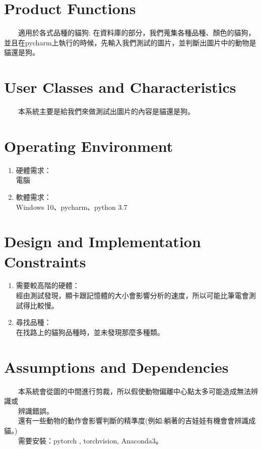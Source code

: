 \documentclass{scrreprt}
\begin{document}
\begin{CJK*}{UTF8}{bsmi}
\section{Product Functions}
　　適用於各式品種的貓狗: 在資料庫的部分，我們蒐集各種品種、顏色的貓狗，並且在pycharm上執行的時候，先輸入我們測試的圖片，並判斷出圖片中的動物是貓還是狗。

\section{User Classes and Characteristics}
　　本系統主要是給我們來做測試出圖片的內容是貓還是狗。

\section{Operating Environment}
\begin{enumerate}
	\item 硬體需求：\\電腦
	\item 軟體需求：\\Windows 10、pycharm、python 3.7
\end{enumerate}

\section{Design and Implementation Constraints}
\begin{enumerate}
	\item 需要較高階的硬體：\\經由測試發現，顯卡跟記憶體的大小會影響分析的速度，所以可能比筆電會測試得比較慢。
	\item 尋找品種：\\在找路上的貓狗品種時，並未發現那麼多種類。
\end{enumerate}

\section{Assumptions and Dependencies}
　　本系統會從圖的中間進行剪裁，所以假使動物偏離中心點太多可能造成無法辨識或\\
　　辨識錯誤。\\
　　還有一些動物的動作會影響判斷的精準度(例如:躺著的吉娃娃有機會會辨識成貓。)\\
　　需要安裝：pytorch , torchvision, Anaconda3。\\





\end{CJK*}
\end{document}
